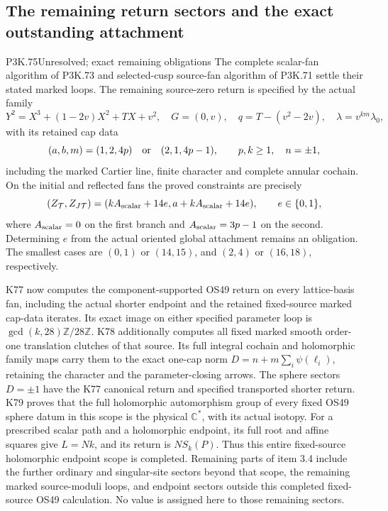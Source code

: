 \subsection{The remaining return sectors and the exact outstanding attachment}
\begin{statement}{P3K.75}{Unresolved; exact remaining obligations}
The complete scalar-fan algorithm of P3K.73 and selected-cusp
source-fan algorithm of P3K.71 settle their stated marked loops.
The remaining source-zero return is specified by the actual family
\[
 Y^2=X^3+(1-2v)X^2+TX+v^2,\quad G=(0,v),\quad
 q=T-(v^2-2v),\quad \lambda=v^{km}\lambda_0,
\]
with its retained cap data
\[
 (a,b,m)=(1,2,4p)\quad\hbox{or}\quad(2,1,4p-1),
 \qquad p,k\ge1,\quad n=\pm1,
\]
including the marked Cartier line, finite character and complete
annular cochain. On the initial and reflected fans the proved
constraints are precisely
\[
 (Z_{\mathcal T},Z_{J\mathcal T})=
 (kA_{\rm scalar}+14e,a+kA_{\rm scalar}+14e),\qquad
 e\in\{0,1\},
\]
where \(A_{\rm scalar}=0\) on the first branch and
\(A_{\rm scalar}=3p-1\) on the second. Determining \(e\)
from the actual oriented global attachment remains an obligation.
The smallest cases are \((0,1)\) or \((14,15)\), and
\((2,4)\) or \((16,18)\), respectively.

K77 now computes the component-supported OS49 return on every
lattice-basis fan, including the actual shorter endpoint and
the retained fixed-source marked cap-data iterates. Its exact
image on either specified parameter loop is
\(\gcd(k,28)\mathbb Z/28\mathbb Z\).
K78 additionally computes all fixed marked smooth order-one
translation clutches of that source. Its full integral cochain
and holomorphic family maps carry them to the exact one-cap norm
\(D=n+m\sum_i\psi(\ell_i)\), retaining the character and the
parameter-closing arrows. The sphere sectors \(D=\pm1\) have the
K77 canonical return and specified transported shorter return.
K79 proves that the full holomorphic automorphism group of every
fixed OS49 sphere datum in this scope is the physical
\(\mathbb C^*\), with its actual isotopy. For a prescribed scalar
path and a holomorphic endpoint, its full root and affine squares
give \(L=Nk\), and its return is \(N S_k(P)\). Thus this entire
fixed-source holomorphic endpoint scope is completed.
Remaining parts of item 3.4 include the further ordinary and
singular-site sectors beyond that scope, the remaining marked
source-moduli loops, and endpoint sectors outside this completed
fixed-source OS49 calculation. No value is assigned here to those
remaining sectors.
\end{statement}
